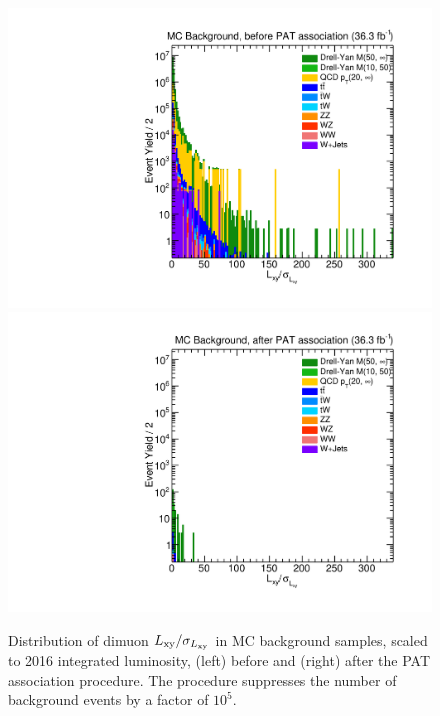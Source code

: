 \begin{figure}[p]
  \centering
  \includegraphics[width=\DSquareWidth]{figures/displaced/REPEFF_MC_LxySig-before.pdf}
  \hspace*{-2em}
  \includegraphics[width=\DSquareWidth]{figures/displaced/REPEFF_MC_LxySig-after.pdf}
  \caption{Distribution of dimuon $L_{\mathrm{xy}}/\sigma_{L_{\mathrm{xy}}}$ in MC background samples, scaled to 2016 integrated luminosity, (left) before and (right) after the PAT association procedure. The procedure suppresses the number of background events by a factor of $10^5$.}
  \label{fig:dd:REPEFF_MC_LxySig}
\end{figure}
